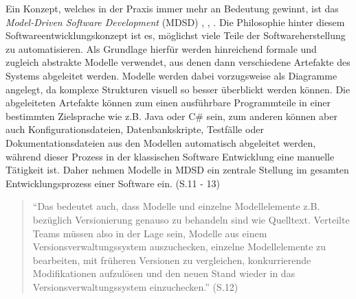 
Ein Konzept, welches in der Praxis immer mehr an Bedeutung gewinnt, ist das \textit{Model-Driven
Software Development} (MDSD) \cite{MDA}, \cite{MDSD}, \cite{GPR06}. Die Philosophie hinter diesem
Softwareentwicklungskonzept ist es,
möglichst viele Teile der Softwareherstellung zu automatisieren. Als Grundlage hierfür werden
hinreichend formale und zugleich abstrakte Modelle verwendet, aus denen dann verschiedene Artefakte
des Systems abgeleitet werden. Modelle werden dabei vorzugsweise als Diagramme angelegt, da komplexe
Strukturen visuell so besser überblickt werden können. Die abgeleiteten Artefakte können zum einen
ausführbare Programmteile in einer bestimmten Zielsprache wie z.B. Java oder C\# sein, zum anderen
können aber auch Konfigurationsdateien, Datenbankskripte, Testfälle oder Dokumentationsdateien aus
den Modellen automatisch abgeleitet werden, während  dieser Prozess in der klassischen Software
Entwicklung eine manuelle Tätigkeit ist. Daher nehmen Modelle in MDSD ein zentrale Stellung im
gesamten Entwicklungsprozess einer Software ein. \cite{MDSD} (S.11 - 13)

\begin{quote}
"`Das bedeutet auch, dass Modelle und einzelne Modellelemente z.B. bezüglich Versionierung genauso
zu behandeln sind wie Quelltext. Verteilte Teams müssen also in der Lage sein, Modelle aus einem
Versionsverwaltungssystem auszuchecken, einzelne Modellelemente zu bearbeiten, mit früheren
Versionen zu vergleichen, konkurrierende Modifikationen aufzulösen und den neuen Stand wieder in das
Versionsverwaltungssystem einzuchecken."' \cite{MDSD} (S.12)
\end{quote}

